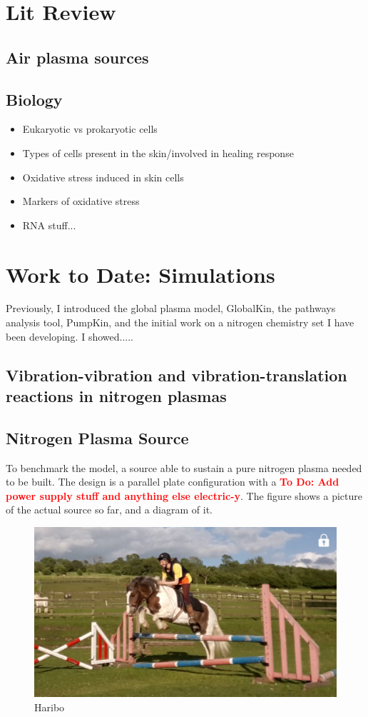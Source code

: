 \documentclass[11pt, oneside]{article}   	%
\newcommand{\todo}[1]{ \textcolor{red}{\bf{To Do:} #1}}
\begin{document}
\section{Lit Review}
\subsection{Air plasma sources}


\subsection{Biology}

\begin{itemize}
\item Eukaryotic vs prokaryotic cells
\item Types of cells present in the skin/involved in healing response
\item Oxidative stress induced in skin cells
\item Markers of oxidative stress
\item RNA stuff...
\end{itemize}

\section{Work to Date: Simulations}
Previously, I introduced the global plasma model, GlobalKin, the pathways analysis tool, PumpKin, and the initial work on a nitrogen chemistry set I have been developing. 
I showed.....

\subsection{Vibration-vibration and vibration-translation reactions in nitrogen plasmas}

\subsection{Nitrogen Plasma Source}
To benchmark the model, a source able to sustain a pure nitrogen plasma needed to be built. 
The design is a parallel plate configuration with a \todo{Add power supply stuff and anything else electric-y}.
The figure shows a picture of the actual source so far, and a diagram of it. 

\begin{figure}
\centering
\includegraphics[width=\textwidth]{Figures/Harry}
\caption{Haribo}
\end{figure}
\end{document}

